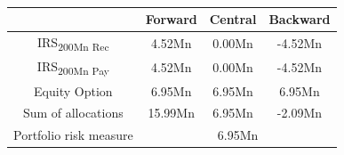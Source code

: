 \documentclass[../Thesis_AHoecherl.tex]{subfiles}
\begin{document}
    \begin{table}[htbp]
        \label{tab:IM perfect hedge}
        \centering
        \begin{tabular}{c|c|c|c}
            & Forward & Central & Backward \\
            \toprule
            IRS\textsubscript{200Mn Rec} & 4.52Mn & 0.00Mn & -4.52Mn \\
            \midrule
            IRS\textsubscript{200Mn Pay} & 4.52Mn & 0.00Mn & -4.52Mn \\
            \midrule
            Equity Option & 6.95Mn & 6.95Mn & 6.95Mn \\
            \bottomrule
            Sum of allocations & 15.99Mn & 6.95Mn & -2.09Mn \\
            \midrule
            Portfolio risk measure & \multicolumn{3}{c}{6.95Mn}  \\
        \end{tabular}%
        \caption{}
    \end{table}
    
    
\end{document}
